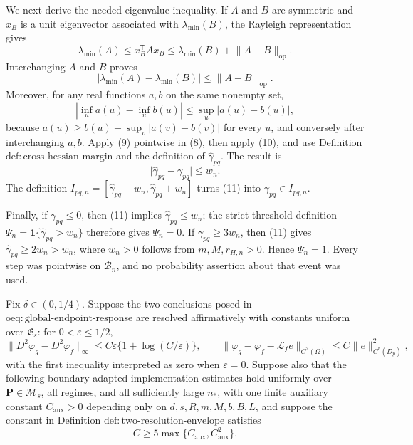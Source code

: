 We next derive the needed eigenvalue inequality.  If \(A\) and \(B\) are symmetric and \(x_B\) is a unit eigenvector associated with \(\lambda_{\min}(B)\), the Rayleigh representation gives
\[
 \lambda_{\min}(A)
 \le x_B^{\mathsf T}Ax_B
 \le\lambda_{\min}(B)+\lVert A-B\rVert_{\mathrm{op}}.
\]
Interchanging \(A\) and \(B\) proves
\[
 \lvert\lambda_{\min}(A)-\lambda_{\min}(B)\rvert
 \le\lVert A-B\rVert_{\mathrm{op}}.
 \tag{9}
\]
Moreover, for any real functions \(a,b\) on the same nonempty set,
\[
 \left\lvert\inf_u a(u)-\inf_u b(u)\right\rvert
 \le\sup_u\lvert a(u)-b(u)\rvert,
 \tag{10}
\]
because \(a(u)\ge b(u)-\sup_v\lvert a(v)-b(v)\rvert\) for every \(u\), and conversely after interchanging \(a,b\).  Apply (9) pointwise in (8), then apply (10), and use Definition \(\mathrm{def:cross\text{-}hessian\text{-}margin}\) and the definition of \(\widehat\gamma_{pq}\).  The result is
\[
 \lvert\widehat\gamma_{pq}-\gamma_{pq}\rvert\le w_n.
 \tag{11}
\]
The definition \(I_{pq,n}=[\widehat\gamma_{pq}-w_n,\widehat\gamma_{pq}+w_n]\) turns (11) into \(\gamma_{pq}\in I_{pq,n}\).

Finally, if \(\gamma_{pq}\le0\), then (11) implies \(\widehat\gamma_{pq}\le w_n\); the strict-threshold definition \(\Psi_n=\mathbf 1\{\widehat\gamma_{pq}>w_n\}\) therefore gives \(\Psi_n=0\).  If \(\gamma_{pq}\ge3w_n\), then (11) gives \(\widehat\gamma_{pq}\ge2w_n>w_n\), where \(w_n>0\) follows from \(m,M,r_{H,n}>0\).  Hence \(\Psi_n=1\).  Every step was pointwise on \(\mathcal B_n\), and no probability assertion about that event was used.

Fix \(\delta\in(0,1/4)\).  Suppose the two conclusions posed in \(\mathrm{oeq:global\text{-}endpoint\text{-}response}\) are resolved affirmatively with constants uniform over \(\mathfrak E_s\): for \(0<\varepsilon\le1/2\),
\[
 \lVert D^2\varphi_g-D^2\varphi_f\rVert_\infty
 \le C\varepsilon\{1+\log(C/\varepsilon)\},
 \qquad
 \lVert\varphi_g-\varphi_f-\mathscr L_fe\rVert_{C^2(\Omega)}
 \le C\lVert e\rVert_{C^r(D_p)}^2,
 \tag{A}
\]
with the first inequality interpreted as zero when \(\varepsilon=0\).  Suppose also that the following boundary-adapted implementation estimates hold uniformly over \(\mathbf P\in\mathcal M_s\), all regimes, and all sufficiently large \(n_\ast\), with one finite auxiliary constant \(C_{\mathrm{aux}}>0\) depending only on \(d,s,R,m,M,b,B,L\), and suppose the constant in Definition \(\mathrm{def:two\text{-}resolution\text{-}envelope}\) satisfies
\[
 C\ge5\max\{C_{\mathrm{aux}},C_{\mathrm{aux}}^2\}.
 \tag{C}
\]

